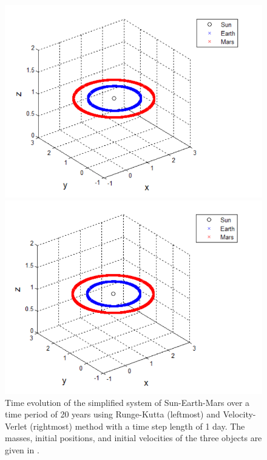     
\begin{figure}[H]
\centering
\begin{minipage}{.5\textwidth}
  \centering
  \includegraphics[width=1\linewidth]{Figures/sun_earth_mars_test_RK4.png}
\end{minipage}%
\begin{minipage}{.5\textwidth}
  \centering
  \includegraphics[width=1\linewidth]{Figures/sun_earth_mars_test_VV.png}
\end{minipage}
\caption{
Time evolution of the simplified system of Sun-Earth-Mars over a time period of 20 years using Runge-Kutta (leftmost) and Velocity-Verlet (rightmost) method with a time step length of 1 day.
The masses, initial positions, and initial velocities of the three objects are given in .
}
\label{fig:SunEarthMarsTest}
\end{figure}